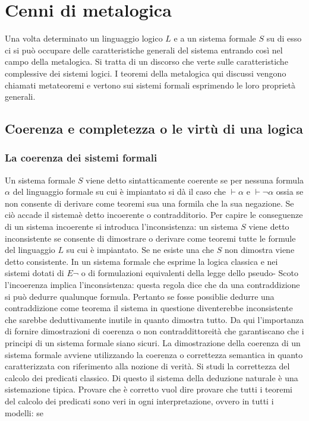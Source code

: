 \chapter{Cenni di metalogica}
Una volta determinato un linguaggio logico $L$ e a un sistema formale $S$ su di esso ci si pu\`o occupare delle caratteristiche generali del sistema entrando
cos\`i nel campo della metalogica. Si tratta di un discorso che verte sulle caratteristiche complessive dei sistemi logici. I teoremi della metalogica qui 
discussi vengono chiamati metateoremi e vertono sui sistemi formali esprimendo le loro propriet\`a generali.
\section{Coerenza e completezza o le virt\`u di una logica}
\subsection{La coerenza dei sistemi formali}
Un sistema formale $S$ viene detto sintatticamente coerente se per nessuna formula $\alpha$ del linguaggio formale su cui \`e impiantato si d\`a il caso che 
$\vdash\alpha$ e $\vdash\neg\alpha$ ossia se non consente di derivare come teoremi sua una formila che la sua negazione. Se ci\`o accade il sistema\`e detto
incoerente o contradditorio. Per capire le conseguenze di un sistema incoerente si introduca l'inconsistenza: un sistema $S$ viene detto inconsistente se 
consente di dimostrare o derivare come teoremi tutte le formule del linguaggio $L$ su cui \`e impiantato. Se ne esiste una che $S$ non dimostra viene detto 
consistente. In un sistema formale che esprime la logica classica e nei sistemi dotati di $E\neg$ o di formulazioni equivalenti della legge dello pseudo-
Scoto l'incoerenza implica l'inconsistenza: questa regola dice che da una contraddizione si pu\`o dedurre qualunque formula. Pertanto se fosse possiblie 
dedurre una contraddizione come teorema il sistema in questione diventerebbe inconsistente che sarebbe deduttivamente inutile in quanto dimostra tutto. Da 
qui l'importanza di fornire dimostrazioni di coerenza o non contraddittoreit\`a che garantiscano che i principi di un sistema formale siano sicuri. La 
dimostrazione della coerenza di un sistema formale avviene utilizzando la coerenza o correttezza semantica in quanto caratterizzata con riferimento alla 
nozione di verit\`a. Si studi la correttezza del calcolo dei predicati classico. Di questo il sistema della deduzione naturale \`e una sistemazione tipica.
Provare che \`e corretto vuol dire provare che tutti i teoremi del calcolo dei predicati sono veri in ogni interpretazione, ovvero in tutti i modelli: se
